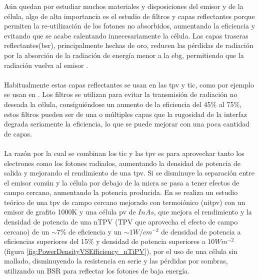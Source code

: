 Aún quedan por estudiar muchos materiales y disposiciones del emisor y de la célula, algo de alta importancia es el estudio de filtros y capas reflectantes porque permiten la re-utilización de los fotones no absorbidos, aumentando la eficiencia y evitando que se acabe calentando innecesariamente la célula. Las capas traseras reflectantes(\acrshort{bsr}), principalmente hechas de oro, reducen las pérdidas de radiación por la absorción de la radiación de energía menor a la \acrshort{ebg}, permitiendo que la radiación vuelva al emisor \cite{nTPV_Review}.\\\\
Habitualmente estas capas reflectantes se usan en las \acrshort{tpv} y \acrshort{tic}, como por ejemplo se usan en \cite{thermoionic_TPV_NF,modelEfficiency_NF_TPV,thermophotovoltaic_40}. Los filtros se utilizan para evitar la transmisión de radiación no deseada  la célula, consiguiéndose un aumento de la eficiencia del 45\% al 75\%, estos filtros pueden ser de una o múltiples capas que la rugosidad de la interfaz degrada seriamente la eficiencia, lo que se puede mejorar con una poca cantidad de capas\cite{multiLayerFilters}.\\\\
La razón por la cual se combinan los \acrshort{tic} y las \acrshort{tpv} es para aprovechar tanto los electrones como los fotones radiados, aumentando la densidad de potencia de salida y mejorando el rendimiento de una \acrshort{tpv}. Si se disminuye la separación entre el emisor común y la célula por debajo de la micra se pasa a tener efectos de campo cercano, aumentando la potencia producida. En \cite{thermoionic_TPV_NF} se realiza un estudio teórico de una \acrshort{tpv} de campo cercano mejorado con termoiónico (\acrshort{nitpv}) con un emisor de grafito 1000K y una célula \acrshort{pv} de $InAs$, que mejora el rendimiento y la densidad de potencia de una nTPV (TPV que aprovecha el efecto de campo cercano) de un $\sim$7\% de eficiencia y un $\sim 1 W/cm^{-2}$ de densidad de potencia a eficiencias superiores del 15\% y  densidad de potencia superiores a 10$Wm^{-2}$ (figura \ref{fig:PowerDensityVSEfficiency_nTiPV}), por el uso de una célula sin mallado, disminuyendo la resistencia en serie y las pérdidas por sombras, utilizando un BSR para reflectar los fotones de baja energía.\\
